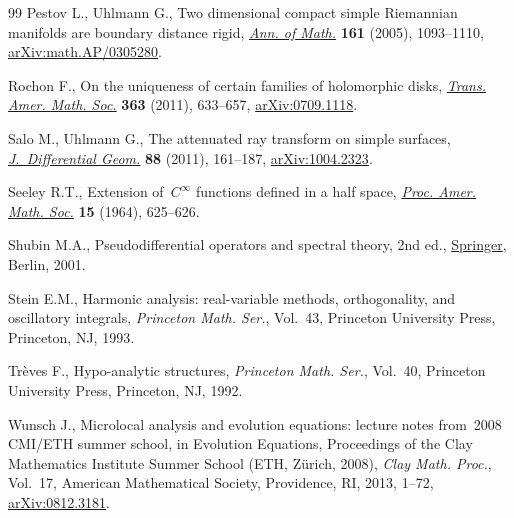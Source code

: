 \documentclass[10pt,a4paper]{amsart}
\numberwithin{equation}{section}
\theoremstyle{definition}
\newcommand{\1}{{\bf 1}}
\begin{document}
\begin{thebibliography}{99}
Pestov L., Uhlmann G., Two dimensional compact simple {R}iemannian manifolds
 are boundary distance rigid,
 \href{https://doi.org/10.4007/annals.2005.161.1093}{\textit{Ann. of Math.}}
 \textbf{161} (2005), 1093--1110,
 \href{http://arxiv.org/abs/math.AP/0305280}{arXiv:math.AP/0305280}.

Rochon F., On the uniqueness of certain families of holomorphic disks,
 \href{https://doi.org/10.1090/S0002-9947-2010-05159-1}{\textit{Trans. Amer.
 Math. Soc.}} \textbf{363} (2011), 633--657,
 \href{http://arxiv.org/abs/0709.1118}{arXiv:0709.1118}.

Salo M., Uhlmann G., The attenuated ray transform on simple surfaces,
 \href{https://doi.org/10.4310/jdg/1317758872}{\textit{J.~Differential Geom.}}
 \textbf{88} (2011), 161--187,
 \href{http://arxiv.org/abs/1004.2323}{arXiv:1004.2323}.

Seeley R.T., Extension of~{$C^{\infty }$} functions defined in a half space,
 \href{https://doi.org/10.2307/2034761}{\textit{Proc. Amer. Math. Soc.}}
 \textbf{15} (1964), 625--626.

Shubin M.A., Pseudodifferential operators and spectral theory, 2nd ed.,
 \href{https://doi.org/10.1007/978-3-642-56579-3}{Springer}, Berlin, 2001.

Stein E.M., Harmonic analysis: real-variable methods, orthogonality, and
 oscillatory integrals, \textit{Princeton Math. Ser.}, Vol.~43, Princeton
 University Press, Princeton, NJ, 1993.

Tr\`eves F., Hypo-analytic structures, \textit{Princeton Math. Ser.}, Vol.~40,
 Princeton University Press, Princeton, NJ, 1992.

Wunsch J., Microlocal analysis and evolution equations: lecture notes from~2008
 {CMI}/{ETH} summer school, in Evolution {E}quations, Proceedings of the Clay
 Mathematics Institute Summer School (ETH, Z\"urich, 2008), \textit{Clay Math.
 Proc.}, Vol.~17, American Mathematical Society, Providence, RI, 2013, 1--72,
 \href{http://arxiv.org/abs/0812.3181}{arXiv:0812.3181}.

\end{thebibliography}
\end{document}
